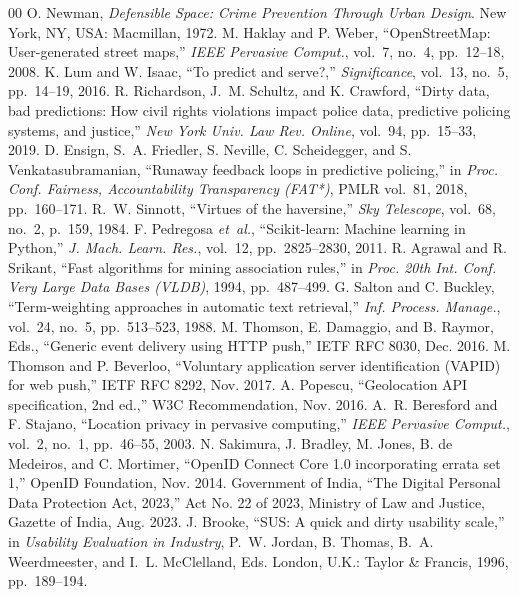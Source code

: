 \documentclass[conference]{IEEEtran}
\begin{document}
\begin{thebibliography}{00}
 O. Newman, \emph{Defensible Space: Crime Prevention Through Urban Design}. New York, NY, USA: Macmillan, 1972.
 M. Haklay and P. Weber, ``OpenStreetMap: User-generated street maps,'' \emph{IEEE Pervasive Comput.}, vol.~7, no.~4, pp.~12--18, 2008.
 K. Lum and W. Isaac, ``To predict and serve?,'' \emph{Significance}, vol.~13, no.~5, pp.~14--19, 2016.
 R. Richardson, J.~M. Schultz, and K. Crawford, ``Dirty data, bad predictions: How civil rights violations impact police data, predictive policing systems, and justice,'' \emph{New York Univ. Law Rev. Online}, vol.~94, pp.~15--33, 2019.
 D. Ensign, S.~A. Friedler, S. Neville, C. Scheidegger, and S. Venkatasubramanian, ``Runaway feedback loops in predictive policing,'' in \emph{Proc. Conf. Fairness, Accountability Transparency (FAT*)}, PMLR vol.~81, 2018, pp.~160--171.
 R.~W. Sinnott, ``Virtues of the haversine,'' \emph{Sky Telescope}, vol.~68, no.~2, p.~159, 1984.
 F. Pedregosa \emph{et~al.}, ``Scikit-learn: Machine learning in Python,'' \emph{J. Mach. Learn. Res.}, vol.~12, pp.~2825--2830, 2011.
 R. Agrawal and R. Srikant, ``Fast algorithms for mining association rules,'' in \emph{Proc. 20th Int. Conf. Very Large Data Bases (VLDB)}, 1994, pp.~487--499.
 G. Salton and C. Buckley, ``Term-weighting approaches in automatic text retrieval,'' \emph{Inf. Process. Manage.}, vol.~24, no.~5, pp.~513--523, 1988.
 M. Thomson, E. Damaggio, and B. Raymor, Eds., ``Generic event delivery using HTTP push,'' IETF RFC 8030, Dec. 2016.
 M. Thomson and P. Beverloo, ``Voluntary application server identification (VAPID) for web push,'' IETF RFC 8292, Nov. 2017.
 A. Popescu, ``Geolocation API specification, 2nd ed.,'' W3C Recommendation, Nov. 2016.
 A.~R. Beresford and F. Stajano, ``Location privacy in pervasive computing,'' \emph{IEEE Pervasive Comput.}, vol.~2, no.~1, pp.~46--55, 2003.
 N. Sakimura, J. Bradley, M. Jones, B. de Medeiros, and C. Mortimer, ``OpenID Connect Core 1.0 incorporating errata set 1,'' OpenID Foundation, Nov. 2014.
 Government of India, ``The Digital Personal Data Protection Act, 2023,'' Act No. 22 of 2023, Ministry of Law and Justice, Gazette of India, Aug. 2023.
 J. Brooke, ``SUS: A quick and dirty usability scale,'' in \emph{Usability Evaluation in Industry}, P.~W. Jordan, B. Thomas, B.~A. Weerdmeester, and I.~L. McClelland, Eds. London, U.K.: Taylor \& Francis, 1996, pp.~189--194.
\end{thebibliography}
\end{document}
